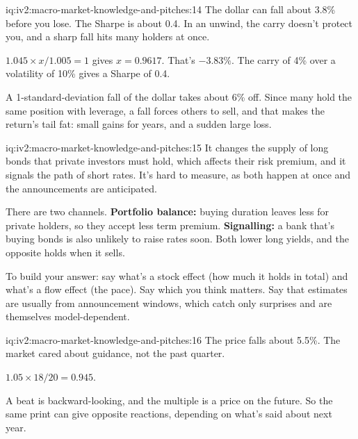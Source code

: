 \begin{solution}{iq:iv2:macro-market-knowledge-and-pitches:14}
The dollar can fall about 3.8\% before you lose. The Sharpe is about 0.4. In an unwind, the carry doesn't protect you, and a sharp fall hits many holders at once.

$1.045 \times x/1.005 = 1$ gives $x = 0.9617$. That's $-3.83\%$. The carry of 4\% over a volatility of 10\% gives a Sharpe of 0.4.

A 1-standard-deviation fall of the dollar takes about 6\% off. Since many hold the same position with leverage, a fall forces others to sell, and that makes the return's tail fat: small gains for years, and a sudden large loss.

\end{solution}

\begin{solution}{iq:iv2:macro-market-knowledge-and-pitches:15}
It changes the supply of long bonds that private investors must hold, which affects their risk premium, and it signals the path of short rates. It's hard to measure, as both happen at once and the announcements are anticipated.

There are two channels. \textbf{Portfolio balance:} buying duration leaves less for private holders, so they accept less term premium. \textbf{Signalling:} a bank that's buying bonds is also unlikely to raise rates soon. Both lower long yields, and the opposite holds when it sells.

To build your answer: say what's a stock effect (how much it holds in total) and what's a flow effect (the pace). Say which you think matters. Say that estimates are usually from announcement windows, which catch only surprises and are themselves model-dependent.

\end{solution}

\begin{solution}{iq:iv2:macro-market-knowledge-and-pitches:16}
The price falls about 5.5\%. The market cared about guidance, not the past quarter.

$1.05 \times 18/20 = 0.945$.

A beat is backward-looking, and the multiple is a price on the future. So the same print can give opposite reactions, depending on what's said about next year.

\end{solution}


